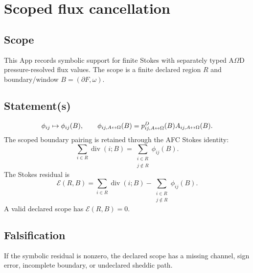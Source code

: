 \section{Scoped flux cancellation}
\label{app:scoped-flux-cancellation}

\subsection{Scope}\label{app:scoped-flux:scope}
This App records symbolic support for finite Stokes with separately typed A\(\Omega\)D pressure-resolved flux values. The scope is a finite declared region \(R\) and boundary/window \(B=(\partial F,\omega)\).

\subsection{Statement(s)}\label{app:scoped-flux:statements}

\[
\phi_{ij}\mapsto \phi_{ij}(B),
\qquad
\phi_{ij,A{\leftrightarrow}\Omega}(B)=p^D_{ij,A{\leftrightarrow}\Omega}(B)A_{ij,A{\leftrightarrow}\Omega}(B).
\]
The scoped boundary pairing is retained through the AFC Stokes identity:
\begin{equation}
\sum_{i\in R}\operatorname{div}(i;B)
=
\sum_{\substack{i\in R\\j\notin R}}\phi_{ij}(B).
\label{app:scoped-flux:eq:afc-pairing}
\end{equation}
The Stokes residual is
\begin{equation}
\mathcal E(R,B)
=
\sum_{i\in R}\operatorname{div}(i;B)
-
\sum_{\substack{i\in R\\j\notin R}}\phi_{ij}(B).
\label{app:scoped-flux:eq:residual}
\end{equation}
A valid declared scope has \(\mathcal E(R,B)=0\).

\subsection{Falsification}\label{app:scoped-flux:falsification}
If the symbolic residual is nonzero, the declared scope has a missing channel, sign error, incomplete boundary, or undeclared sheddic path.

